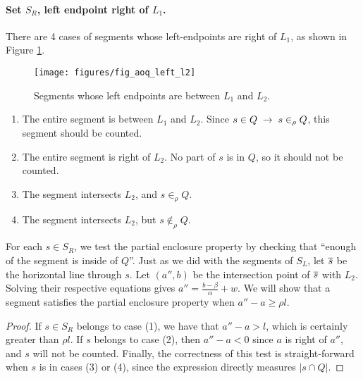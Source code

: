 \paragraph{Set $S_R$, left endpoint right of $L_1$.}
There are 4 cases of segments whose left-endpoints are right of $L_1$, as shown in Figure \ref{fig:slabs:one:aoq_left_l2}.

\begin{figure}[t]
\begin{center}
  \texttt{[image: figures/fig\_aoq\_left\_l2]}
  \caption{Segments whose left endpoints are between $L_1$ and $L_2$.}
  \label{fig:slabs:one:aoq_left_l2}
\end{center}
\end{figure}


\begin{enumerate}
 \item The entire segment is between $L_1$ and $L_2$. Since $s \in Q \;\rightarrow\; s \in_\rho Q$, this segment should be counted.

 \item The entire segment is right of $L_2$. No part of $s$ is in $Q$, so it should not be counted.

 \item The segment intersects $L_2$, and $s \in_\rho Q$.

 \item The segment intersects $L_2$, but $s \not \in_\rho Q$.

\end{enumerate}

For each $s \in S_R$, we test the partial enclosure property by checking that ``enough of the segment is inside of $Q$''.
Just as we did with the segments of $S_L$, let $\overline{s}$ be the horizontal line through $s$.
Let $(a'', b)$ be the intersection point of $\overline{s}$ with $L_2$.
Solving their respective equations gives $a'' = \frac{b - \beta}{\alpha} + w$.  
We will show that a segment satisfies the partial enclosure property when $a'' - a \geq \rho l$.

\begin{proof}
If $s \in S_R$ belongs to case (1), we have that $a'' - a > l$, which is certainly greater than $\rho l$. 
If $s$ belongs to case (2), then $a'' - a < 0$ since $a$ is right of $a''$, and $s$ will not be counted.
Finally, the correctness of this test is straight-forward when $s$ is in cases (3) or (4), since the expression directly measures $|s \cap Q|$.
\end{proof}

